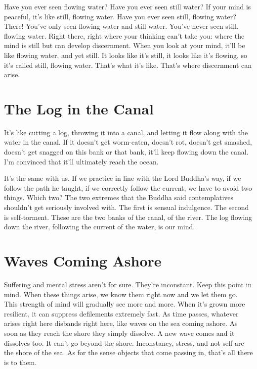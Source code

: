 \enlargethispage{2\baselineskip}
Have you ever seen flowing water? Have you ever seen still water? If your mind is peaceful, it's like still, flowing water. Have you ever seen still, flowing water? There! You've only seen flowing water and still water. You've never seen still, flowing water. Right there, right where your thinking can't take you: where the mind is still but can develop discernment. When you look at your mind, it'll be like flowing water, and yet still. It looks like it's still, it looks like it's flowing, so it's called still, flowing water. That's what it's like. That's where discernment can arise.

\clearpage

\section{The Log in the Canal}

It's like cutting a log, throwing it into a canal, and letting it flow along with the water in the canal. If it doesn't get worm-eaten, doesn't rot, doesn't get smashed, doesn't get snagged on this bank or that bank, it'll keep flowing down the canal. I'm convinced that it'll ultimately reach the ocean. 

It's the same with us. If we practice in line with the Lord Buddha's way, if we follow the path he taught, if we correctly follow the current, we have to avoid two things. Which two? The two extremes that the Buddha said contemplatives shouldn't get seriously involved with. The first is sensual indulgence. The second is self-torment. These are the two banks of the canal, of the river. The log flowing down the river, following the current of the water, is our mind.

\vspace*{-\baselineskip}
\section{Waves Coming Ashore}

\enlargethispage{2\baselineskip}
Suffering and mental stress aren't for sure. They're inconstant. Keep this point in mind. When these things arise, we know them right now and we let them go. This strength of mind will gradually see more and more. When it's grown more resilient, it can suppress defilements extremely fast. As time passes, whatever arises right here disbands right here, like waves on the sea coming ashore. As soon as they reach the shore they simply dissolve. A new wave comes and it dissolves too. It can't go beyond the shore. Inconstancy, stress, and not-self are the shore of the sea. As for the sense objects that come passing in, that's all there is to them.

